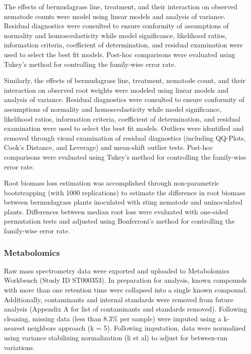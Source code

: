 \documentclass[9pt,lineno]{elife}
\begin{document}
The effects of bermudagrass line, treatment, and their interaction on observed nematode counts were model using linear models and analysis of variance.  Residual diagnostics were consulted to ensure conformity of assumptions of normality and homoscedasticity while model significance, likelihood ratios, information criteria, coefficient of determination, and residual examination were used to select the best fit models.  Post-hoc comparisons were evaluated using Tukey's method for controlling the family-wise error rate. 

Similarly, the effects of bermudagrass line, treatment, nematode count, and their interaction on observed root weights were modeled using linear models and analysis of variance. Residual diagnostics were consulted to ensure conformity of assumptions of normality and homoscedasticity while model significance, likelihood ratios, information criteria, coefficient of determination, and residual examination were used to select the best fit models.  Outliers were identified and removed through visual examination of residual diagnostics (including QQ-Plots, Cook's Distance, and Leverage) and mean-shift outlier tests.  Post-hoc comparisons were evaluated using Tukey's method for controlling the family-wise error rate.

Root biomass loss estimation was accomplished through non-parametric bootstrapping (with 1000 replications) to estimate the difference in root biomass between bermudagrass plants inoculated with sting nematode and uninoculated plants.  Differences between median root loss were evaluated with one-sided permutation tests and adjusted using Bonferroni's method for controlling the family-wise error rate.


\subsubsection{Metabolomics}

Raw mass spectrometry data were exported and uploaded to Metabolomics Workbench (Study ID ST000353).  In preparation for analysis, known compounds with more than one retention time were collapsed into a single known compound.  Additionally, contaminants and internal standards were removed from future analysis (Appendix A for list of contaminants and standards removed).  Following cleaning, missing data (less than 8.3\% per sample) were imputed using a k-nearest neighbors approach (k = 5).  Following imputation, data were normalized using variance stabilizing normalization (li et al) to adjust for between-run variations.  
\end{document}
